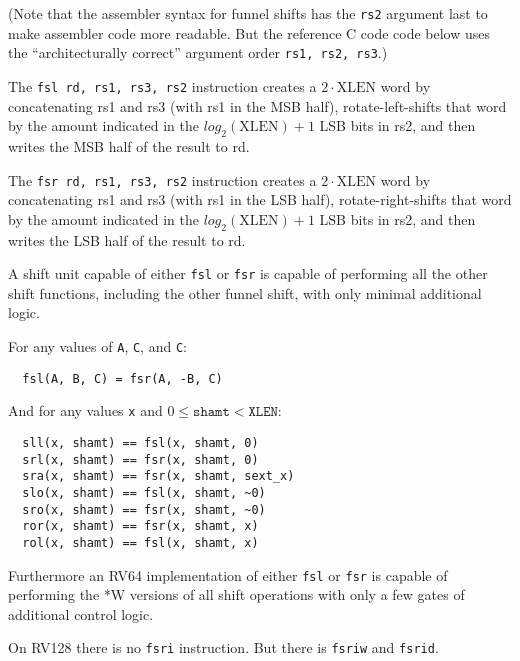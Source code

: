(Note that the assembler syntax for funnel shifts has the {\tt rs2} argument
last to make assembler code more readable. But the reference C code code below
uses the ``architecturally correct'' argument order {\tt rs1, rs2, rs3}.)

The {\tt fsl rd, rs1, rs3, rs2} instruction creates a $2\cdot\textrm{XLEN}$ word
by concatenating rs1 and rs3 (with rs1 in the MSB half), rotate-left-shifts that
word by the amount indicated in the $log_2(\textrm{XLEN})+1$ LSB bits in rs2, and
then writes the MSB half of the result to rd.

The {\tt fsr rd, rs1, rs3, rs2} instruction creates a $2\cdot\textrm{XLEN}$ word
by concatenating rs1 and rs3 (with rs1 in the LSB half), rotate-right-shifts that
word by the amount indicated in the $log_2(\textrm{XLEN})+1$ LSB bits in rs2, and
then writes the LSB half of the result to rd.





A shift unit capable of either {\tt fsl} or {\tt fsr} is capable of performing all
the other shift functions, including the other funnel shift, with only minimal additional
logic.

For any values of {\tt A}, {\tt C}, and {\tt C}:

\begin{minipage}{\linewidth}
\begin{verbatim}
  fsl(A, B, C) = fsr(A, -B, C)
\end{verbatim}
\end{minipage}

And for any values {\tt x} and $0 \le \texttt{shamt} < \texttt{XLEN}$:

\begin{minipage}{\linewidth}
\begin{verbatim}
  sll(x, shamt) == fsl(x, shamt, 0)
  srl(x, shamt) == fsr(x, shamt, 0)
  sra(x, shamt) == fsr(x, shamt, sext_x)
  slo(x, shamt) == fsl(x, shamt, ~0)
  sro(x, shamt) == fsr(x, shamt, ~0)
  ror(x, shamt) == fsr(x, shamt, x)
  rol(x, shamt) == fsl(x, shamt, x)
\end{verbatim}
\end{minipage}

Furthermore an RV64 implementation of either {\tt fsl} or {\tt fsr} is capable
of performing the *W versions of all shift operations with only a few gates
of additional control logic.

On RV128 there is no {\tt fsri} instruction. But there is {\tt fsriw} and {\tt fsrid}.

